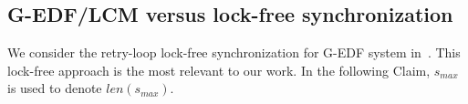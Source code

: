 \documentclass[conference]{sig-alternate}
\begin{document}

\subsection{G-EDF/LCM versus lock-free synchronization}
\label{gedf-lcm-lock-free}
We consider the retry-loop lock-free synchronization for G-EDF system in~\cite{key-5}. This lock-free approach is the most relevant to our work. In the following Claim, $s_{max}$ is used to denote $len(s_{max})$.
\end{document}
